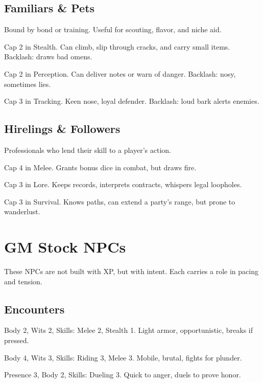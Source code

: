 \documentclass[11pt]{article}
\begin{document}
\subsection{Familiars \& Pets}
Bound by bond or training. Useful for scouting, flavor, and niche aid.  
\begin{description}[leftmargin=2cm]
  \item[Shadow-Cat] Cap 2 in Stealth. Can climb, slip through cracks, and carry small items. Backlash: draws bad omens.  
  \item[Crow Messenger] Cap 2 in Perception. Can deliver notes or warn of danger. Backlash: nosy, sometimes lies.  
  \item[Hound of the Fens] Cap 3 in Tracking. Keen nose, loyal defender. Backlash: loud bark alerts enemies.  
\end{description}

\subsection{Hirelings \& Followers}
Professionals who lend their skill to a player’s action.  
\begin{description}[leftmargin=2cm]
  \item[Bodyguard] Cap 4 in Melee. Grants bonus dice in combat, but draws fire.  
  \item[Scribe] Cap 3 in Lore. Keeps records, interprets contracts, whispers legal loopholes.  
  \item[Scout] Cap 3 in Survival. Knows paths, can extend a party’s range, but prone to wanderlust.  
\end{description}

\section{GM Stock NPCs}
These NPCs are not built with XP, but with intent. Each carries a role in pacing and tension.  

\subsection{Encounters}
\begin{description}[leftmargin=2cm]
  \item[Bandit Skirmisher] Body 2, Wits 2, Skills: Melee 2, Stealth 1. Light armor, opportunistic, breaks if pressed.  
  \item[Ykrul Rider] Body 4, Wits 3, Skills: Riding 3, Melee 3. Mobile, brutal, fights for plunder.  
  \item[Street Bravo] Presence 3, Body 2, Skills: Dueling 3. Quick to anger, duels to prove honor.  
\end{description}
\end{document}
